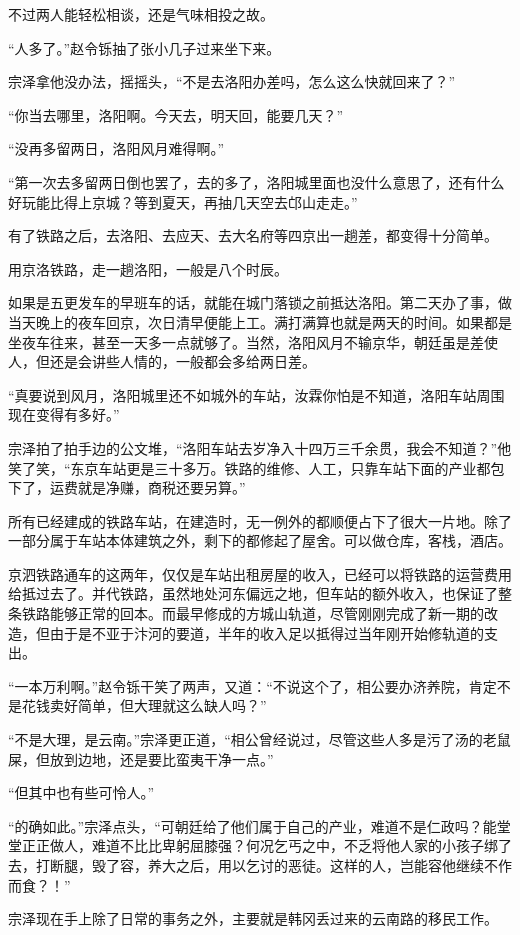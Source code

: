不过两人能轻松相谈，还是气味相投之故。

“人多了。”赵令铄抽了张小几子过来坐下来。

宗泽拿他没办法，摇摇头，“不是去洛阳办差吗，怎么这么快就回来了？”

“你当去哪里，洛阳啊。今天去，明天回，能要几天？”

“没再多留两日，洛阳风月难得啊。”

“第一次去多留两日倒也罢了，去的多了，洛阳城里面也没什么意思了，还有什么好玩能比得上京城？等到夏天，再抽几天空去邙山走走。”

有了铁路之后，去洛阳、去应天、去大名府等四京出一趟差，都变得十分简单。

用京洛铁路，走一趟洛阳，一般是八个时辰。

如果是五更发车的早班车的话，就能在城门落锁之前抵达洛阳。第二天办了事，做当天晚上的夜车回京，次日清早便能上工。满打满算也就是两天的时间。如果都是坐夜车往来，甚至一天多一点就够了。当然，洛阳风月不输京华，朝廷虽是差使人，但还是会讲些人情的，一般都会多给两日差。

“真要说到风月，洛阳城里还不如城外的车站，汝霖你怕是不知道，洛阳车站周围现在变得有多好。”

宗泽拍了拍手边的公文堆，“洛阳车站去岁净入十四万三千余贯，我会不知道？”他笑了笑，“东京车站更是三十多万。铁路的维修、人工，只靠车站下面的产业都包下了，运费就是净赚，商税还要另算。”

所有已经建成的铁路车站，在建造时，无一例外的都顺便占下了很大一片地。除了一部分属于车站本体建筑之外，剩下的都修起了屋舍。可以做仓库，客栈，酒店。

京泗铁路通车的这两年，仅仅是车站出租房屋的收入，已经可以将铁路的运营费用给抵过去了。并代铁路，虽然地处河东偏远之地，但车站的额外收入，也保证了整条铁路能够正常的回本。而最早修成的方城山轨道，尽管刚刚完成了新一期的改造，但由于是不亚于汴河的要道，半年的收入足以抵得过当年刚开始修轨道的支出。

“一本万利啊。”赵令铄干笑了两声，又道：“不说这个了，相公要办济养院，肯定不是花钱卖好简单，但大理就这么缺人吗？”

“不是大理，是云南。”宗泽更正道，“相公曾经说过，尽管这些人多是污了汤的老鼠屎，但放到边地，还是要比蛮夷干净一点。”

“但其中也有些可怜人。”

“的确如此。”宗泽点头，“可朝廷给了他们属于自己的产业，难道不是仁政吗？能堂堂正正做人，难道不比比卑躬屈膝强？何况乞丐之中，不乏将他人家的小孩子绑了去，打断腿，毁了容，养大之后，用以乞讨的恶徒。这样的人，岂能容他继续不作而食？！”

宗泽现在手上除了日常的事务之外，主要就是韩冈丢过来的云南路的移民工作。

